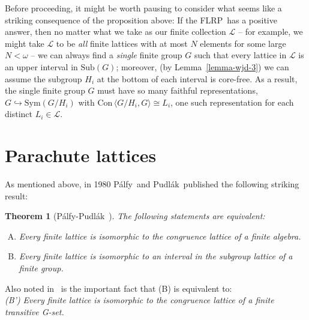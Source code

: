 \documentclass[cm,dissertation]{uhthesis}
\theoremstyle{plain}
\newtheorem{theorem}{Theorem}[section]
\theoremstyle{definition}
\theoremstyle{remark}
\numberwithin{theorem}{section}
\numberwithin{claim}{chapter}
\numberwithin{equation}{section}
\numberwithin{conjecture}{chapter}
\newcommand{\Palfy}{P\'alfy}
\newcommand{\Pudlak}{Pudl\'ak}
\newcommand{\<}{\ensuremath{\langle}}
\renewcommand{\>}{\ensuremath{\rangle}}
\newcommand{\Con}{\ensuremath{\mathrm{Con\,}}}
\newcommand{\Sub}{\ensuremath{\mathrm{Sub}}}
\newcommand{\Sym}{\ensuremath{\mathrm{Sym}}}
\newcommand{\FLRP}{{\small FLRP}}
\newcommand{\0}{\ensuremath{\mathbf{0}}}
\newcommand{\1}{\ensuremath{\mathbf{1}}}
\newcommand{\2}{\ensuremath{\mathbf{2}}}
\newcommand{\3}{\ensuremath{\mathbf{3}}}
\newcommand{\4}{\ensuremath{\mathbf{4}}}
\newcommand{\5}{\ensuremath{\mathbf{5}}}
\newcommand{\sL}{\ensuremath{\mathscr{L}}}
\begin{document}
Before proceeding, it might be worth pausing to consider what seems like a
striking consequence of the proposition above: 
If the \FLRP\ has a positive answer, then no matter 
what we take as our finite collection $\sL$ -- for example, we
might take $\sL$ to be \emph{all} finite lattices with
at most $N$ elements for some large $N< \omega$ -- we can always find a \emph{single}
finite group $G$ such that every lattice in $\sL$ is an upper interval in
$\Sub(G)$; moreover, (by Lemma~\ref{lemma-wjd-3}) we can assume the subgroup
$H_i$ at the bottom of each interval is core-free.  As a result, the single
finite group $G$ must have so many faithful representations,  $G\hookrightarrow \Sym(G/H_i)$
with  $\Con\<G/H_i, G\> \cong L_i$,  one such representation for each distinct $L_i\in \sL$. 

\section{Parachute lattices}
\label{sec:parachute-lattices}
%
%
As mentioned above, in 1980 \Palfy\ and \Pudlak\ published the following
striking result:
\begin{theorem}[\Palfy-\Pudlak~\cite{Palfy:1980}]
\label{thm:P5}
The following statements are equivalent:
\begin{enumerate}[(A)]
\item Every finite lattice is isomorphic to
  the congruence lattice of a finite algebra.
\item Every finite lattice is isomorphic to
  an interval in the subgroup lattice of a finite group.
\end{enumerate}
\end{theorem}
\noindent Also noted in~\cite{Palfy:1980} is the important fact that (B) is equivalent to:
\\[4pt]
{\it (B') Every finite lattice is isomorphic to
  the congruence lattice of a finite transitive G-set.}

\vskip3mm
\end{document}
